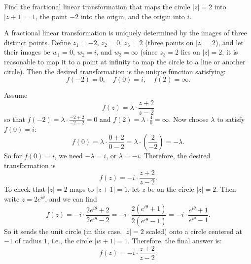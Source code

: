 \documentclass[12pt]{article}
\begin{document}
\begin{statement}[2]
    Find the fractional linear transformation that maps the circle $|z| = 2$ into $|z + 1| = 1$, the point $-2$ into the origin, and the origin into $i$.
\end{statement}
\begin{newproof}
    A fractional linear transformation is uniquely determined by the images of three distinct points. Define $z_1 = -2$, $z_2 = 0$, $z_3 = 2$ (three points on $|z| = 2$), and let their images be $w_1 = 0$, $w_2 = i$, and $w_3 = \infty$ (since $z_3 = 2$ lies on $|z| = 2$, it is reasonable to map it to a point at infinity to map the circle to a line or another circle). Then the desired transformation is the unique function satisfying:
    $$ f(-2) = 0,\quad f(0) = i,\quad f(2) = \infty. $$
    \par Assume
    $$ f(z) = \lambda \cdot \frac{z + 2}{z - 2} $$
    so that $f(-2) = \lambda \cdot \frac{-2 + 2}{-2 - 2} = 0$ and $f(2) = \lambda \cdot \frac{4}{0} = \infty$.
    Now choose $\lambda$ to satisfy $f(0) = i$:
    $$ f(0) = \lambda \cdot \frac{0 + 2}{0 - 2} = \lambda \cdot \left( \frac{2}{-2} \right) = -\lambda. $$
    So for $f(0) = i$, we need $-\lambda = i$, or $\lambda = -i$. Therefore, the desired transformation is
    $$ f(z) = -i \cdot \frac{z + 2}{z - 2}. $$
    To check that $|z| = 2$ maps to $|z + 1| = 1$, let $z$ be on the circle $|z| = 2$. Then write $z = 2e^{i\theta}$, and we can find
    $$ f(z) = -i \cdot \frac{2e^{i\theta} + 2}{2e^{i\theta} - 2} = -i \cdot \frac{2(e^{i\theta} + 1)}{2(e^{i\theta} - 1)} = -i \cdot \frac{e^{i\theta} + 1}{e^{i\theta} - 1}. $$
    So it sends the unit circle (in this case, $|z| = 2$ scaled) onto a circle centered at $-1$ of radius $1$, i.e., the circle $|w + 1| = 1$.
    Therefore, the final answer is: 
    $$ f(z) = -i \cdot \frac{z + 2}{z - 2}. $$
\end{newproof}
\end{document}
